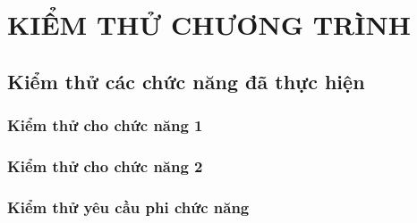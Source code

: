 \chapter{KIỂM THỬ CHƯƠNG TRÌNH}\label{chap:kiem-thu}

\section{Kiểm thử các chức năng đã thực hiện}
\subsection{Kiểm thử cho chức năng 1}
\pending

\subsection{Kiểm thử cho chức năng 2}
\pending

\subsection{Kiểm thử yêu cầu phi chức năng}
\pending
